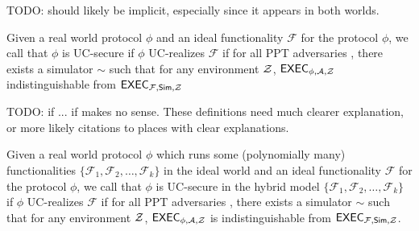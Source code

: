 TODO: \secparam should likely be implicit, especially since it appears in both worlds.

\begin{definition} \label{def:uc}
	Given a real world protocol $ \phi $ and an ideal functionality $ \mathcal{F} $ for the protocol $ \phi $, we call that $ \phi $ is UC-secure if $ \phi $ UC-realizes $ \mathcal{F} $ if for all PPT adversaries \adv, there exists a simulator $ \sim  $ such that for any environment $ \mathcal{Z} $,
	$\mathsf{EXEC}_{\phi, \mathcal{A}, \mathcal{Z}}$ indistinguishable from $\mathsf{EXEC}_{\mathcal{F},\mathsf{Sim}, \mathcal{Z}}$
\end{definition}

TODO: if ... if makes no sense.  These definitions need much clearer explanation, or more likely citations to places with clear explanations. 

\begin{definition}
	Given a real world protocol $ \phi $ which runs some (polynomially many) functionalities $ \{\mathcal{F}_1, \mathcal{F}_2, \ldots, \mathcal{F}_k\} $ in the ideal world and an ideal functionality $ \mathcal{F} $ for the protocol $ \phi $, we call that $ \phi $ is UC-secure in the hybrid model $ \{\mathcal{F}_1, \mathcal{F}_2, \ldots, \mathcal{F}_k\} $ if $ \phi $ UC-realizes $ \mathcal{F} $ if for all PPT adversaries \adv, there exists a simulator $ \sim  $ such that for any environment $ \mathcal{Z} $,
	$\mathsf{EXEC}_{\phi, \mathcal{A}, \mathcal{Z}}$ is indistinguishable from $\mathsf{EXEC}_{\mathcal{F},\mathsf{Sim}, \mathcal{Z}}$.
\end{definition}






\endinput



BROKEN BOLOW THIS




We fix $J \in \ecJ$ as a generator for public keys.  Any $\KeyGen$ algorithm randomly samples a secret keys $\sk \in \F_q$ and then computes its associate public keys $\pk = \sk J$.  We shall not discuss infrastructure that authorizes public keys.  Yet although our results do not require proof-of-knowledge on $\pk$ per se, we still strongly recommend that back certifications accompany any certificates that authorize $\pk$.

\smallskip



